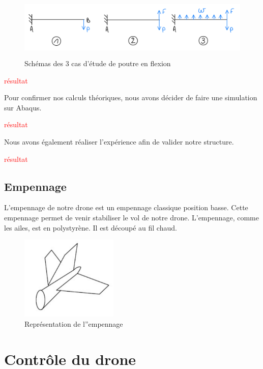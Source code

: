 \documentclass[a4paper,12pt,french]{report}
\begin{document}
\begin{figure}[h]
    \centering
    \includegraphics[height=3cm]{figures/flexion.jpeg}
    \caption{Schémas des 3 cas d'étude de poutre en flexion}
    \label{flex}
\end{figure}

\textcolor{red}{résultat}

Pour confirmer nos calculs théoriques, nous avons décider de faire une simulation sur Abaqus.\newline

\textcolor{red}{résultat}

Nous avons également réaliser l'expérience afin de valider notre structure.\newline

\textcolor{red}{résultat}


\subsection{Empennage}

L'empennage de notre drone est un empennage classique position basse. Cette empennage permet de venir stabiliser le vol de notre drone. L'empennage, comme les ailes, est en polystyrène. Il est découpé au fil chaud.

\begin{figure}[h]
    \centering
    \includegraphics[height=4cm]{figures/emp.jpeg}
    \caption{Représentation de l''empennage}
    \label{flex}
\end{figure}

\newpage
\section{Contrôle du drone}
\end{document}
